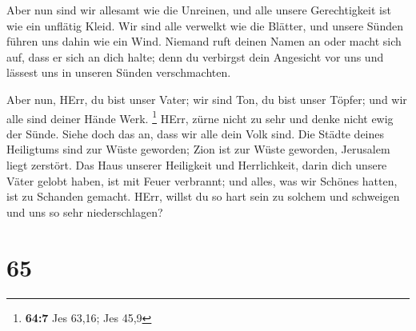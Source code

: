  Aber nun sind wir allesamt wie die Unreinen, und alle
unsere Gerechtigkeit ist wie ein unflätig Kleid. Wir sind alle verwelkt
wie die Blätter, und unsere Sünden führen uns dahin wie ein Wind.
 Niemand ruft deinen Namen an oder macht sich auf, dass er
sich an dich halte; denn du verbirgst dein Angesicht vor uns und lässest
uns in unseren Sünden verschmachten.

 Aber nun, HErr, du bist unser Vater; wir sind Ton, du
bist unser Töpfer; und wir alle sind deiner Hände Werk. \footnote{\textbf{64:7}
  Jes 63,16; Jes 45,9}  HErr, zürne nicht zu sehr und
denke nicht ewig der Sünde. Siehe doch das an, dass wir alle dein Volk
sind.  Die Städte deines Heiligtums sind zur Wüste
geworden; Zion ist zur Wüste geworden, Jerusalem liegt zerstört.
 Das Haus unserer Heiligkeit und Herrlichkeit, darin dich
unsere Väter gelobt haben, ist mit Feuer verbrannt; und alles, was wir
Schönes hatten, ist zu Schanden gemacht.  HErr, willst du
so hart sein zu solchem und schweigen und uns so sehr niederschlagen?

\hypertarget{section-64}{%
\section{65}\label{section-64}}

